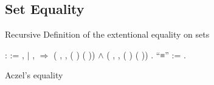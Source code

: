 \subsection{Set Equality}

Recursive Definition of the extentional equality on sets

\begin{coqdoccode}
  \coqdocnoindent
      :  :=\coqdoceol
  \coqdocindent{1.00em}
   ,  \coqdoceol
  \coqdocindent{1.00em}
  \ensuremath{|}   ,    \ensuremath{\Rightarrow}\coqdoceol
  \coqdocindent{2.00em}
  (\coqdockw{\ensuremath{\forall}} , \coqdoctac{\ensuremath{\exists}} ,  ( ) ( )) \ensuremath{\land} (\coqdockw{\ensuremath{\forall}} , \coqdoctac{\ensuremath{\exists}} ,  ( ) ( ))\coqdoceol
  \coqdocindent{1.00em}
  .\coqdoceol
  \coqdocnoindent
{} ``≡'' := .\coqdoceol
\coqdocemptyline
\end{coqdoccode}


Aczel's equality


